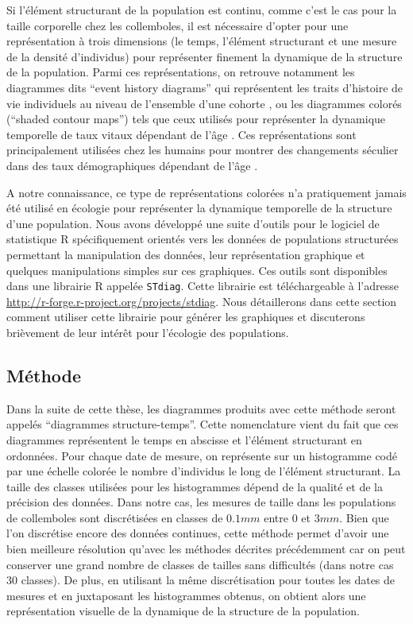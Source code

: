 Si l'élément structurant de la population est continu, comme c'est le cas
pour la taille corporelle chez les collemboles, il est nécessaire d'opter pour
une représentation à trois dimensions (le temps, l'élément structurant et une
mesure de la densité d'individus) pour représenter finement la dynamique de la
structure de la population. Parmi ces représentations, on retrouve notamment les
diagrammes dits ``event history diagrams'' qui représentent les traits
d'histoire de vie individuels au niveau de l'ensemble d'une cohorte
\autocites{carey1998a,carey2008a}, ou les diagrammes colorés (``shaded contour
maps'') tels que ceux utilisés pour représenter la dynamique temporelle de taux
vitaux dépendant de l'âge \autocites[mortalité ou natalité chez les humains par
exemple,][]{vaupel1997a,vaupel1998a}. Ces représentations sont
principalement utilisées chez les humains pour montrer des changements séculier
dans des taux démographiques dépendant de l'âge
\autocite{vaupel1987a,vaupel1997a,vaupel1998a,andreev2000a,erlangsen2003a}.

A notre connaissance, ce type de représentations colorées n'a pratiquement
jamais été utilisé en écologie pour représenter la dynamique temporelle de la
structure d'une population. Nous avons développé une suite d'outils pour le
logiciel de statistique R \autocites{team2012a} spécifiquement
orientés vers les données de populations structurées permettant la manipulation
des données, leur représentation graphique et quelques manipulations simples sur
ces graphiques. Ces outils sont disponibles dans une librairie R appelée
\texttt{STdiag}. Cette librairie est téléchargeable à l'adresse
\url{http://r-forge.r-project.org/projects/stdiag}.
Nous détaillerons dans cette section comment utiliser cette librairie pour
générer les graphiques et discuterons brièvement de leur intérêt pour l'écologie
des populations. 

\subsection{Méthode}

Dans la suite de cette thèse, les diagrammes produits avec cette méthode seront
appelés ``diagrammes structure-temps''. Cette nomenclature vient du fait que ces
diagrammes représentent le temps en abscisse et l'élément structurant en
ordonnées. Pour chaque date de mesure, on représente sur un histogramme codé par
une échelle colorée le nombre d'individus le long de l'élément structurant. La
taille des classes utilisées pour les histogrammes dépend de la qualité et de la
précision des données. Dans notre cas, les mesures de taille dans les
populations de collemboles sont discrétisées en classes de $0.1mm$ entre $0$
et $3mm$. Bien que l'on discrétise encore des données continues, cette méthode
permet d'avoir une bien meilleure résolution qu'avec les méthodes décrites
précédemment car on peut conserver une grand nombre de classes de tailles sans
difficultés (dans notre cas 30 classes). De plus, en utilisant la même
discrétisation pour toutes les dates de mesures et en juxtaposant les
histogrammes obtenus, on obtient alors une représentation visuelle de la
dynamique de la structure de la population. 

